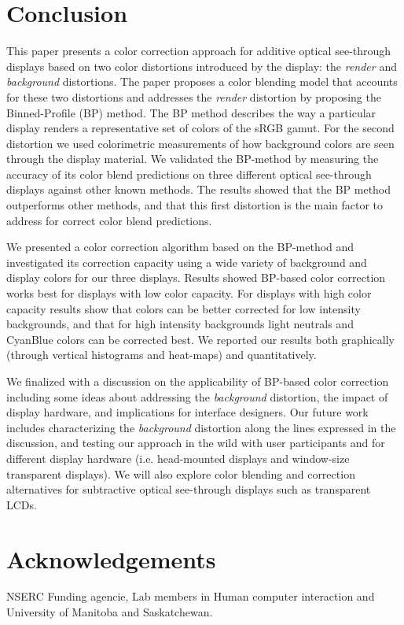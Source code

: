 \documentclass[annual]{acmsiggraph}
\begin{document}
\section{Conclusion}
This paper presents a color correction approach for additive optical see-through displays based on two color distortions introduced by the display: the \textit{render} and \textit{background} distortions. The paper proposes a color blending model that accounts for these two distortions and addresses the \textit{render} distortion by proposing the Binned-Profile (BP) method. The BP method describes the way a particular display renders a representative set of colors of the sRGB gamut. For the second distortion we used colorimetric measurements of how background colors are seen through the display material. We validated the BP-method by measuring the accuracy of its color blend predictions on three different optical see-through displays against other known methods. The results showed that the BP method outperforms other methods, and that this first distortion is the main factor to address for correct color blend predictions.

We presented a color correction algorithm based on the BP-method and investigated its correction capacity using a wide variety of background and display colors for our three displays. Results showed BP-based color correction works best for displays with low color capacity. For displays with high color capacity results show that colors can be better corrected for low intensity backgrounds, and that for high intensity backgrounds light neutrals and CyanBlue colors can be corrected best. We reported our results both graphically (through vertical histograms and heat-maps) and quantitatively.

We finalized with a discussion on the applicability of BP-based color correction including some ideas about addressing the \textit{background} distortion, the impact of display hardware, and implications for interface designers. Our future work includes characterizing the \textit{background} distortion along the lines expressed in the discussion, and testing our approach in the wild with user participants and for different display hardware (i.e. head-mounted displays and window-size transparent displays). We will also explore color blending and correction alternatives for subtractive optical see-through displays such as transparent LCDs.



\section*{Acknowledgements}

NSERC Funding agencie, Lab members in Human computer interaction and University of Manitoba and Saskatchewan.



\end{document}
